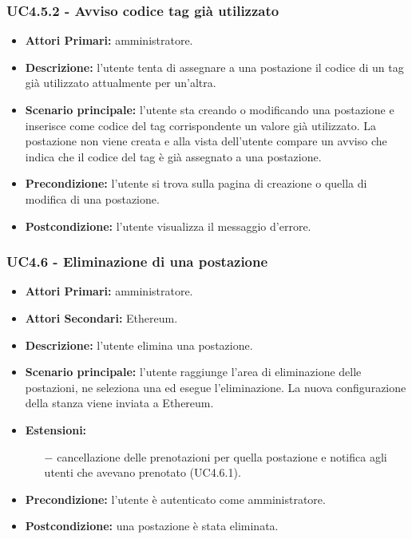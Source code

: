 \subsubsection{UC4.5.2 - Avviso codice tag già utilizzato}
\begin{itemize}
	\item\textbf{Attori Primari:}
	amministratore.
	\item\textbf{Descrizione:}
	l'utente tenta di assegnare a una postazione il codice di un tag già utilizzato attualmente per un'altra.
	\item\textbf{Scenario principale:}
	l'utente sta creando o modificando una postazione e inserisce come codice del tag corrispondente un valore già utilizzato.
	La postazione non viene creata e alla vista dell'utente compare un avviso che indica che il codice del tag è già assegnato a una postazione.
	\item\textbf{Precondizione:}
	l'utente si trova sulla pagina di creazione o quella di modifica di una postazione.
	\item\textbf{Postcondizione:}
	l'utente visualizza il messaggio d'errore.
\end{itemize}

\subsubsection{UC4.6 - Eliminazione di una postazione}
\begin{itemize}
	\item\textbf{Attori Primari:}
	amministratore.
	\item\textbf{Attori Secondari:}
	Ethereum.
	\item\textbf{Descrizione:}
	l'utente elimina una postazione.
	\item\textbf{Scenario principale:} 
	l'utente raggiunge l'area di eliminazione delle postazioni, ne seleziona una ed esegue l'eliminazione. La nuova configurazione della stanza viene inviata a Ethereum.
	\item\textbf{Estensioni:}
	\begin{itemize}
		\item[$-$] cancellazione delle prenotazioni per quella postazione e notifica agli utenti che avevano prenotato (UC4.6.1).
	\end{itemize}
	\item\textbf{Precondizione:} 
	l'utente è autenticato come amministratore.
	\item\textbf{Postcondizione:}
	una postazione è stata eliminata.
\end{itemize}

